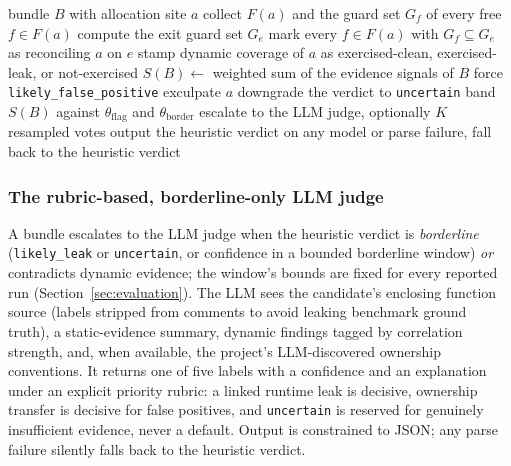 \documentclass[a4paper]{llncs}
\begin{document}
\begin{algorithm}[t]
\caption{Guard-subset-reconciled hybrid judging}
\label{alg:judging}
\begin{algorithmic}[1]
\Require bundle $B$ with allocation site $a$
\State collect $F(a)$ and the guard set $G_f$ of every free $f \in F(a)$
  \State compute the exit guard set $G_e$
  \State mark every $f \in F(a)$ with $G_f \subseteq G_e$ as reconciling $a$ on $e$
\EndFor
\State stamp dynamic coverage of $a$ as exercised-clean, exercised-leak, or not-exercised
\State $S(B) \gets$ weighted sum of the evidence signals of $B$
  \State force \texttt{likely\_false\_positive}
\EndIf
{}
  \State exculpate $a$
\EndIf
{}
  \State downgrade the verdict to \texttt{uncertain}
\EndIf
\State band $S(B)$ against $\theta_{\mathrm{flag}}$ and $\theta_{\mathrm{border}}$
  \State escalate to the LLM judge, optionally $K$ resampled votes
\Else
  \State output the heuristic verdict
\EndIf
\State on any model or parse failure, fall back to the heuristic verdict
\end{algorithmic}
\end{algorithm}

\subsubsection{The rubric-based, borderline-only LLM judge}

A bundle escalates to the LLM judge when the heuristic verdict is
\emph{borderline} (\texttt{likely\_leak} or \texttt{uncertain}, or
confidence in a bounded borderline window) \emph{or} contradicts dynamic
evidence; the window's bounds are fixed for every reported run
(Section~\ref{sec:evaluation}). The LLM sees the candidate's enclosing
function source (labels stripped from comments to avoid leaking
benchmark ground truth), a static-evidence summary, dynamic findings
tagged by correlation strength, and, when available, the project's
LLM-discovered ownership conventions. It returns one of five labels with
a confidence and an explanation under an explicit priority rubric: a
linked runtime leak is decisive, ownership transfer is decisive
for false positives, and \texttt{uncertain} is reserved for genuinely
insufficient evidence, never a default. Output is constrained to JSON;
any parse failure silently falls back to the heuristic verdict.
\end{document}
